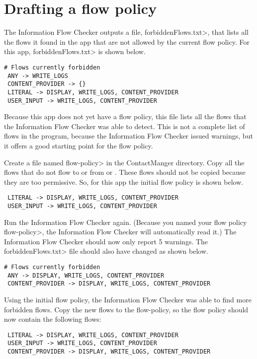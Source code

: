 \section{Drafting a flow policy}

The Information Flow Checker outputs a file, \<forbiddenFlows.txt>, that lists all the flows
 it found in the app that are not allowed by the current flow policy.  For this app, 
 \<forbiddenFlows.txt> is shown below. 

\begin{Verbatim} 
# Flows currently forbidden
 ANY -> WRITE_LOGS 
 CONTENT_PROVIDER -> {}
 LITERAL -> DISPLAY, WRITE_LOGS, CONTENT_PROVIDER 
 USER_INPUT -> WRITE_LOGS, CONTENT_PROVIDER 
\end{Verbatim} 
Because this app does not yet have a flow policy, this file lists all the flows that the 
Information Flow Checker was able to detect.  This is not a complete list of flows in the program,
because the Information Flow Checker issued warnings, but it offers a good starting point 
for the flow policy. 

Create a file named \<flow-policy> in the ContactManger directory.  Copy all the flows that   
do not flow to or from  or \perm{\{\}}.  These flows should not be copied because 
they are too permissive.  So, for this app the initial flow policy is shown below.
\begin{Verbatim} 
 LITERAL -> DISPLAY, WRITE_LOGS, CONTENT_PROVIDER 
 USER_INPUT -> WRITE_LOGS, CONTENT_PROVIDER 
\end{Verbatim}

 Run the Information Flow Checker again.  (Because you named your flow policy 
\<flow-policy>, the Information Flow Checker will automatically read it.)  The Information Flow Checker should
now only report 5 warnings.  The \<forbiddenFlows.txt> file should also have changed as shown
below.

\begin{Verbatim}
# Flows currently forbidden
 ANY -> DISPLAY, WRITE_LOGS, CONTENT_PROVIDER 
 CONTENT_PROVIDER -> DISPLAY, WRITE_LOGS, CONTENT_PROVIDER 
\end{Verbatim}
 
Using the initial flow policy, the Information Flow Checker was able to find more forbidden flows. 
Copy the new flows to the flow-policy,
so the flow policy should now contain the following flows:

\begin{Verbatim} 
 LITERAL -> DISPLAY, WRITE_LOGS, CONTENT_PROVIDER 
 USER_INPUT -> WRITE_LOGS, CONTENT_PROVIDER 
 CONTENT_PROVIDER -> DISPLAY, WRITE_LOGS, CONTENT_PROVIDER 
\end{Verbatim}


